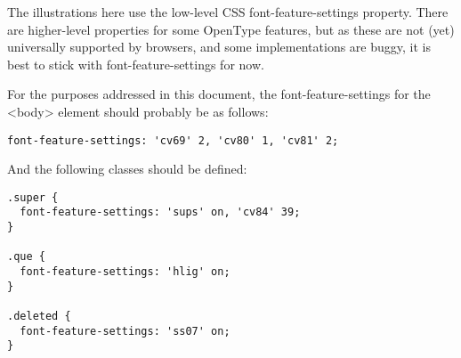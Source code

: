 \noindent The illustrations here use the low-level CSS font-feature-settings property.
There are higher-level properties for some
OpenType features, but as these are not (yet) universally supported by browsers, and some implementations are buggy, it
is best to stick with font-feature-settings for now.

For the purposes addressed in this document, the font-feature-settings for the <body> element
should probably be as follows:
\begin{verbatim}
font-feature-settings: 'cv69' 2, 'cv80' 1, 'cv81' 2;
\end{verbatim}
\noindent And the following classes should be defined:
\begin{verbatim}
.super {
  font-feature-settings: 'sups' on, 'cv84' 39;
}

.que {
  font-feature-settings: 'hlig' on;
}

.deleted {
  font-feature-settings: 'ss07' on;
}
\end{verbatim}
